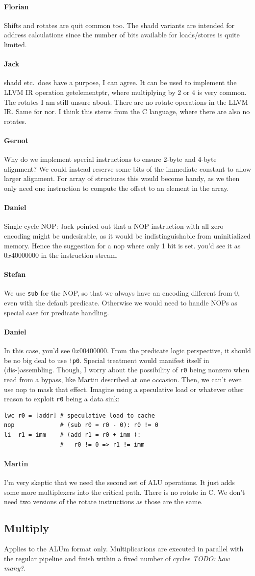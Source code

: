 \documentclass{IEEEtran}
\newcommand{\todo}[1]{{\emph{TODO: #1}}}
\newcommand{\comment}[3]{\paragraph*{\textbf{#1}}{\color{#3}#2}}
\newcommand{\martin}[1]{\comment{Martin}{#1}{Blue}}
\newcommand{\stefan}[1]{\comment{Stefan}{#1}{RoyalPurple}}
\newcommand{\daniel}[1]{\comment{Daniel}{#1}{RoyalBlue}}
\newcommand{\gebhard}[1]{\comment{Gernot}{#1}{RedOrange}}
\newcommand{\fb}[1]{\comment{Florian}{#1}{Emerald}}
\newcommand{\jack}[1]{\comment{Jack}{#1}{Magenta}}
\begin{document}
\fb{Shifts and rotates are quit common too. The shadd variants are intended for
address calculations since the number of bits available for loads/stores is
quite limited.}

\jack{shadd etc.~does have a purpose, I can agree. It can be used to
implement the LLVM IR operation getelementptr, where multiplying by 2 or
4 is very common.  The rotates I am still unsure about. There are no
rotate operations in the LLVM IR. Same for nor. I think this stems from the
C language, where there are also no rotates.}

\gebhard{Why do we implement special instructions to ensure 2-byte and 4-byte alignment?
We could instead reserve some bits of the immediate constant to allow larger alignment.
For array of structures this would become handy, as we then only need one instruction to compute the offset to an element in the array.}

\daniel{Single cycle NOP: Jack pointed out that a NOP instruction with all-zero
encoding might be undesirable, as it would be indistinguishable from uninitialized memory.
Hence the suggestion for a nop where only 1 bit is set. you'd see it as $0x40000000$
in the instruction stream.}

\stefan{We use \texttt{sub} for the NOP, so that we always have an encoding different from 0, even with the default predicate.
Otherwise we would need to handle NOPs as special case for predicate handling.}

\daniel{In this case, you'd see $0x00400000$.
From the predicate logic perspective, it should be no big deal to use \texttt{!p0}.
Special treatment would manifest itself in (dis-)assembling.
Though, I worry about the possibility of \texttt{r0} being nonzero when read from a bypass,
like Martin described at one occasion. Then, we can't even use nop to mask that effect.
Imagine using a speculative load or whatever other reason to exploit \texttt{r0} being a data sink:
}
\begin{verbatim}
lwc r0 = [addr] # speculative load to cache
nop             # (sub r0 = r0 - 0): r0 != 0
li  r1 = imm    # (add r1 = r0 + imm ):
                #   r0 != 0 => r1 != imm
\end{verbatim}

\martin{I'm very skeptic that we need the second set of ALU
operations. It just adds some more multiplexers into the
critical path. There is no rotate in C. We don't need two
versions of the rotate instructions as those are the same.}


\subsection{Multiply} Applies to the ALUm format only. Multiplications are
executed in parallel with the regular pipeline and finish within a fixed number
of cycles \todo{how many?}.
\end{document}
